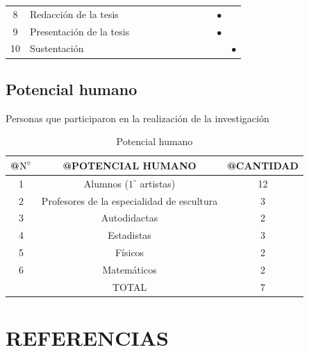 \documentclass[12pt,a4paper]{article}
\begin{document}
\begin{table}[ht!]
\begin{tabular}{|c|p{6cm}|c|c|c|c|c|c|c|c|c|c|}
		8                   & Redacción de la tesis             &                            &           &           &           &           &           &           &           & $\bullet$ &           \\
		9                   & Presentación de la tesis          &                            &           &           &           &           &           &           &           & $\bullet$ &           \\
		10                  & Sustentación                      &                            &           &           &           &           &           &           &           &           & $\bullet$ \\
		\hline
	\end{tabular}
\end{table}



\subsection{Potencial humano}
Personas que participaron en la realización de la investigación

\begin{table}[ht]
	\centering
	\caption{Potencial humano}\label{potencialhumano}
	\begin{tabular}{ccc}
		\Xhline{2pt}
		@$\text N^\circ$ & @POTENCIAL HUMANO                          & @CANTIDAD \\\midrule
		1                & Alumnos ($1^\circ$ artistas)               & 12        \\
		2                & Profesores de la especialidad de escultura & 3         \\
		3                & Autodidactas                               & 2         \\
		4                & Estadistas                                 & 3         \\
		5                & Físicos                                    & 2         \\
		6                & Matemáticos                                & 2         \\\midrule
		                 & TOTAL                                      & 7         \\
		\bottomrule
	\end{tabular}
\end{table}



\section{REFERENCIAS}


\end{document}
